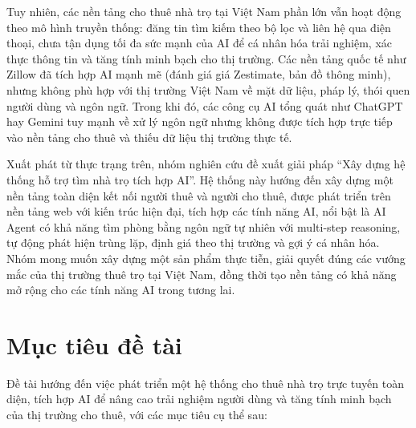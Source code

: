 Tuy nhiên, các nền tảng cho thuê nhà trọ tại Việt Nam phần lớn vẫn hoạt động theo mô hình truyền thống: đăng tin tìm kiếm theo bộ lọc và liên hệ qua điện thoại, chưa tận dụng tối đa sức mạnh của AI để cá nhân hóa trải nghiệm, xác thực thông tin và tăng tính minh bạch cho thị trường. Các nền tảng quốc tế như Zillow đã tích hợp AI mạnh mẽ (đánh giá giá Zestimate, bản đồ thông minh), nhưng không phù hợp với thị trường Việt Nam về mặt dữ liệu, pháp lý, thói quen người dùng và ngôn ngữ. Trong khi đó, các công cụ AI tổng quát như ChatGPT hay Gemini tuy mạnh về xử lý ngôn ngữ nhưng không được tích hợp trực tiếp vào nền tảng cho thuê và thiếu dữ liệu thị trường thực tế.

Xuất phát từ thực trạng trên, nhóm nghiên cứu đề xuất giải pháp ``Xây dựng hệ thống hỗ trợ tìm nhà trọ tích hợp AI''. Hệ thống này hướng đến xây dựng một nền tảng toàn diện kết nối người thuê và người cho thuê, được phát triển trên nền tảng web với kiến trúc hiện đại, tích hợp các tính năng AI, nổi bật là AI Agent có khả năng tìm phòng bằng ngôn ngữ tự nhiên với multi-step reasoning, tự động phát hiện trùng lặp, định giá theo thị trường và gợi ý cá nhân hóa. Nhóm mong muốn xây dựng một sản phẩm thực tiễn, giải quyết đúng các vướng mắc của thị trường thuê trọ tại Việt Nam, đồng thời tạo nền tảng có khả năng mở rộng cho các tính năng AI trong tương lai.

\section{Mục tiêu đề tài}

Đề tài hướng đến việc phát triển một hệ thống cho thuê nhà trọ trực tuyến toàn diện, tích hợp AI để nâng cao trải nghiệm người dùng và tăng tính minh bạch của thị trường cho thuê, với các mục tiêu cụ thể sau:

